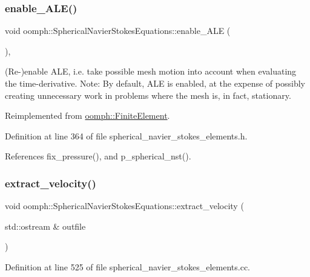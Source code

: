 \subsubsection{\texorpdfstring{enable\+\_\+\+A\+L\+E()}{enable\_ALE()}}
{\footnotesize\ttfamily void oomph\+::\+Spherical\+Navier\+Stokes\+Equations\+::enable\+\_\+\+A\+LE (\begin{DoxyParamCaption}{ }\end{DoxyParamCaption})\hspace{0.3cm}{\ttfamily [inline]}, {\ttfamily [virtual]}}



(Re-\/)enable A\+LE, i.\+e. take possible mesh motion into account when evaluating the time-\/derivative. Note\+: By default, A\+LE is enabled, at the expense of possibly creating unnecessary work in problems where the mesh is, in fact, stationary. 



Reimplemented from \hyperlink{classoomph_1_1FiniteElement_a92ef8967fa4e2d6c33c51ea3efa3aa82}{oomph\+::\+Finite\+Element}.



Definition at line 364 of file spherical\+\_\+navier\+\_\+stokes\+\_\+elements.\+h.



References fix\+\_\+pressure(), and p\+\_\+spherical\+\_\+nst().

\mbox{\label{classoomph_1_1SphericalNavierStokesEquations_ae0e2fd028424f6d2c86a903ddc852485}} 
\subsubsection{\texorpdfstring{extract\+\_\+velocity()}{extract\_velocity()}}
{\footnotesize\ttfamily void oomph\+::\+Spherical\+Navier\+Stokes\+Equations\+::extract\+\_\+velocity (\begin{DoxyParamCaption}\item[{std\+::ostream \&}]{outfile }\end{DoxyParamCaption})}



Definition at line 525 of file spherical\+\_\+navier\+\_\+stokes\+\_\+elements.\+cc.



